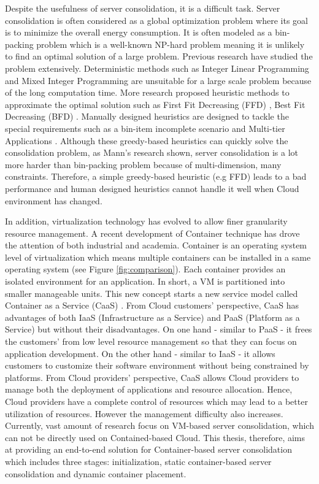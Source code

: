 Despite the usefulness of server consolidation, it is a difficult task. 
Server consolidation is often considered as a global optimization problem 
where its goal is to minimize the overall energy consumption. 
It is often modeled as a bin-packing problem \cite{Mann:2015ua} which is a well-known NP-hard problem meaning it is unlikely to find an optimal solution 
of a large problem. Previous research have studied the problem extensively. 
Deterministic methods such as  
Integer Linear Programming \cite{Speitkamp:2010ck} and Mixed
Integer Programming \cite{Wang:2016eh} are unsuitable for a large scale problem 
because of the long computation time.  More research proposed heuristic methods
 to approximate the optimal solution such as 
First Fit Decreasing (FFD) \cite{Panigrahy:2011wk}, Best Fit Decreasing (BFD) \cite{Xu:2010vh}.
Manually designed heuristics are designed to tackle the special requirements such 
as a bin-item incomplete scenario \cite{Gupta:2008ul} and Multi-tier Applications \cite{Jung:2008vb, Li:2009wf}. Although these greedy-based heuristics can quickly solve the consolidation problem,  as Mann's research \cite{Mann:2015ua} shown, 
server consolidation is a lot more harder than bin-packing problem because of multi-dimension, many constraints. Therefore, a simple greedy-based heuristic (e.g FFD) leads to a bad performance and human designed heuristics cannot handle it well when Cloud environment has changed.

In addition, virtualization technology has evolved to allow finer granularity resource management.
A recent development of Container technique \cite{Soltesz:2007cu} has drove the attention of both industrial and academia.
Container is an operating system level of virtualization which means multiple containers can be installed in a same operating system (see Figure \ref{fig:comparison}). Each container provides an isolated environment for an application. In short, a VM is partitioned into smaller manageable units.
This new concept starts a new service model called Container as a Service (CaaS) \cite{Piraghaj:2015uf}. 
From Cloud customers' perspective, CaaS has advantages of both IaaS (Infrastructure as a Service) and PaaS (Platform as a Service) but without their disadvantages. On one hand - similar to PaaS - it frees the customers' from low level resource management so that they can focus on application development. On the other hand - similar to IaaS - it allows customers to customize their software environment without being constrained by platforms. 
From Cloud providers' perspective, CaaS allows Cloud providers to manage both the deployment of applications and resource allocation.
Hence, Cloud providers have a complete control of resources which may lead to a better utilization of resources. However the management difficulty also increases. 
Currently, vast amount of research focus on VM-based server consolidation, which can not be directly used on Contained-based Cloud.
This thesis, therefore, aims at providing an end-to-end solution for Container-based server consolidation which includes three stages: initialization, static container-based server consolidation and dynamic container placement.

